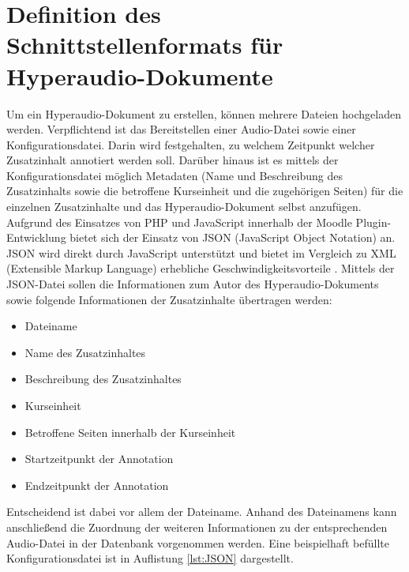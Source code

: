 \section{Definition des Schnittstellenformats für Hyperaudio-Dokumente}
\label{sec:konfigurationsdatei}
Um ein Hyperaudio-Dokument zu erstellen, können mehrere Dateien hochgeladen werden. Verpflichtend ist das Bereitstellen einer Audio-Datei sowie einer Konfigurationsdatei. Darin wird festgehalten, zu welchem Zeitpunkt welcher Zusatzinhalt annotiert werden soll. Darüber hinaus ist es mittels der Konfigurationsdatei möglich Metadaten (Name und Beschreibung des Zusatzinhalts sowie die betroffene Kurseinheit und die zugehörigen Seiten) für die einzelnen Zusatzinhalte und das Hyperaudio-Dokument selbst anzufügen.
Aufgrund des Einsatzes von PHP und JavaScript innerhalb der Moodle Plugin-Entwicklung bietet sich der Einsatz von JSON (JavaScript Object Notation) an. JSON wird direkt durch JavaScript unterstützt und bietet im Vergleich zu XML (Extensible Markup Language) erhebliche Geschwindigkeitsvorteile \citep{nurseitov2009comparison}.
Mittels der JSON-Datei sollen die Informationen zum Autor des Hyperaudio-Dokuments sowie folgende Informationen der Zusatzinhalte übertragen werden:

\begin{itemize}
\item Dateiname
\item Name des Zusatzinhaltes
\item Beschreibung des Zusatzinhaltes
\item Kurseinheit
\item Betroffene Seiten innerhalb der Kurseinheit
\item Startzeitpunkt der Annotation
\item Endzeitpunkt der Annotation
\end{itemize}

Entscheidend ist dabei vor allem der Dateiname. Anhand des Dateinamens kann anschließend die Zuordnung der weiteren Informationen zu der entsprechenden Audio-Datei in der Datenbank vorgenommen werden. Eine beispielhaft befüllte Konfigurationsdatei ist in Auflistung \ref{lst:JSON} dargestellt. 

